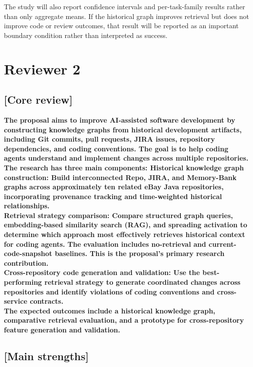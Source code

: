 \documentclass[11pt]{article}
\begin{document}
The study will also report confidence intervals and per-task-family results rather than only aggregate means. If the historical graph improves retrieval but does not improve code or review outcomes, that result will be reported as an important boundary condition rather than interpreted as success.

\section*{Reviewer 2}


\subsection*{[Core review]}
\textbf{The proposal aims to improve AI-assisted software development by constructing knowledge graphs from historical development artifacts, including Git commits, pull requests, JIRA issues, repository dependencies, and coding conventions. The goal is to help coding agents understand and implement changes across multiple repositories.\\
The research has three main components:
Historical knowledge graph construction: Build interconnected Repo, JIRA, and Memory-Bank graphs across approximately ten related eBay Java repositories, incorporating provenance tracking and time-weighted historical relationships.\\
Retrieval strategy comparison: Compare structured graph queries, embedding-based similarity search (RAG), and spreading activation to determine which approach most effectively retrieves historical context for coding agents. The evaluation includes no-retrieval and current-code-snapshot baselines. This is the proposal's primary research contribution.\\
Cross-repository code generation and validation: Use the best-performing retrieval strategy to generate coordinated changes across repositories and identify violations of coding conventions and cross-service contracts.\\
The expected outcomes include a historical knowledge graph, comparative retrieval evaluation, and a prototype for cross-repository feature generation and validation.}

\subsection*{[Main strengths]}
\end{document}
